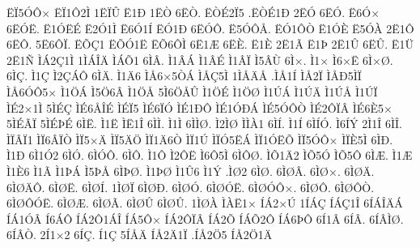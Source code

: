 {^^cb^^cf5^^d3^^d4^^d7
^^cb^^cf1^^d42^^cc
1^^cb^^cf^^db
^^cb1^^d0
1^^cb^^d2
6^^cb^^d2.
^^cb^^d2^^c92^^cf5
.^^cb^^d2^^c91^^d0
2^^cb^^d3
6^^cb^^d3.
^^cb6^^d3^^d7
6^^cb^^d3^^cb.
^^cb1^^d3^^cb^^c9
^^cb2^^d31^^cc
^^cb6^^d31^^cd
^^cb^^d31^^d0
6^^cb^^d3^^d4.
^^cb5^^d3^^d4^^c5.
^^cb^^d31^^d4^^d2
^^cb1^^d3^^c8
^^cb5^^d3^^c0
2^^cb1^^d4
6^^cb^^d4.
5^^cb6^^d4^^cf.
^^cb^^d5^^c71
^^cb^^d5^^d31^^cb
^^cb^^d56^^d4^^cc
6^^cb1^^c6
6^^cb^^c8.
^^cb1^^c8
2^^cb1^^c3
^^cb1^^de
2^^cb1^^db
6^^cb^^db.
^^cb1^^dc
2^^cb1^^d1
^^cc^^c12^^c71^^cc
1^^cc^^c1^^ce^^c4
^^cc^^c1^^d51
6^^cc^^c2.
^^cc1^^c2^^c1
^^cc1^^c2^^c9
^^cc1^^c2^^cf
^^cc5^^c2^^d9
6^^cc^^d7.
^^cc1^^d7
^^cc6^^d7^^cb
6^^cc^^d7^^d8.
6^^cc^^c7.
^^cc1^^c7
^^cc2^^c7^^c1^^d4
6^^cc^^c4.
^^cc1^^c46
^^cc^^c56^^d75^^d2^^c1
^^cc^^c5^^c75^^cc
1^^cc^^c5^^c4^^c5
.^^cc^^c51^^cd
^^cc^^c52^^cf
^^cc^^c5^^d05^^cc^^cf
^^cc^^c56^^d3^^d45^^d7
^^cc1^^d6^^c1
^^cc5^^d66^^c2
^^cc1^^d6^^c5
5^^cc6^^d6^^c5^^db
^^cc1^^d6^^c9
^^cc1^^d6^^d8
^^cc1^^da^^c1
^^cc1^^da^^c4
^^cc1^^da^^c5
^^cc1^^da^^cf
^^cc^^c92^^d71^^cc
5^^cc^^c9^^c7
^^cc^^c96^^c5^^ce^^c9
^^cc^^c9^^cf5
^^cc^^c96^^cf^^d3
^^cc^^c91^^d0^^d4
^^cc^^c91^^d3^^d0^^c1
^^cc^^c95^^d3^^d4^^d2
^^cc^^c92^^d4^^cf^^c2
^^cc^^c96^^c85^^d7
5^^cc^^c9^^c3^^cf
5^^cc^^c9^^de^^c9
6^^cc^^cb.
^^cc1^^cb
^^cc^^cb1^^ce
6^^cc^^cc.
^^cc1^^cc
6^^cc^^cc^^d8.
^^cc2^^cc^^d8
^^cc^^cc^^c01
6^^cc^^cd.
^^cc1^^cd
6^^cc^^cd^^d3.
^^cc6^^cd^^dd
2^^cc1^^ce
6^^cc^^ce.
^^cc^^cf^^c2^^cf1
^^cc^^cf6^^c2^^cf^^d2
^^cc^^cf5^^d7^^c4
^^cc^^cf5^^c4^^d6
^^cc^^cf1^^c46^^d2
^^cc^^cf1^^da
^^cc^^cf^^d35^^cb^^c1
^^cc^^cf1^^d3^^cb^^d5
^^cc^^cf5^^d3^^d4^^d7
^^cc^^cf^^c85^^cc
6^^cc^^d0.
^^cc1^^d0
6^^cc1^^d32
6^^cc^^d3.
6^^cc^^d3^^d4.
6^^cc^^d4.
^^cc1^^d4
^^cc2^^d4^^cb
^^cc6^^d45^^cc
6^^cc^^d4^^d8.
^^cc^^d51^^c42
^^cc^^d55^^d3
^^cc^^d55^^d4
6^^cc^^c6.
^^cc1^^c6
^^cc1^^c86
^^cc1^^c3
^^cc1^^de^^c1
^^cc5^^de^^c5
6^^cc^^de^^d8.
^^cc1^^de^^d8
^^cc1^^db6
^^cc1^^dd
.^^cc^^d82
6^^cc^^d8.
6^^cc^^d8^^c2.
6^^cc^^d8^^d7.
6^^cc^^d8^^c4.
6^^cc^^d8^^c4^^d4.
6^^cc^^d8^^cb.
6^^cc^^d8^^cd.
1^^cc^^d8^^cf
6^^cc^^d8^^d0.
6^^cc^^d8^^d3.
6^^cc^^d8^^d3^^cb.
6^^cc^^d8^^d3^^d4^^d7.
6^^cc^^d8^^d4.
6^^cc^^d8^^d4^^d2.
6^^cc^^d8^^d4^^d3^^cb.
6^^cc^^d8^^c6.
6^^cc^^d8^^c3.
6^^cc^^d8^^db
6^^cc^^d8^^db.
1^^cc^^d8^^c0
^^cc^^c0^^cb1^^d7
^^cd^^c12^^d7^^da
1^^cd^^c1^^c7
^^cd^^c1^^c71^^ce
6^^cd^^c1^^ce^^c4^^c1
^^cd^^c11^^d3^^c2
^^cd6^^c1^^d4
^^cd^^c12^^d41^^c1^^ce
^^cd^^c15^^d4^^d7
^^cd^^c12^^d4^^cf^^c2
^^cd^^c12^^d5
^^cd^^c1^^d52^^d4
^^cd^^c16^^de^^d4
6^^cd1^^c2
6^^cd^^c2.
6^^cd^^c2^^cc^^d8.
6^^cd^^c2^^d2.
2^^cd1^^d72
6^^cd^^c7.
^^cd1^^c7
5^^cd^^c5^^c4
^^cd^^c52^^c41^^cf
.^^cd^^c52^^d65
^^cd^^c52^^d61^^c4
}
